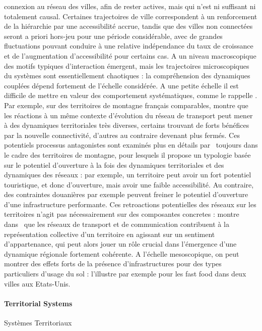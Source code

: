 {connexion au réseau des villes, afin de rester actives, mais qui n'est ni suffisant ni totalement causal. Certaines trajectoires de ville correspondent à un renforcement de la hiérarchie par une accessibilité accrue, tandis que des villes non connectées seront a priori hors-jeu pour une période considérable, avec de grandes fluctuations pouvant conduire à une relative indépendance du taux de croissance et de l'augmentation d'accessibilité pour certains cas. A un niveau macroscopique des motifs typiques d'interaction émergent, mais les trajectoires microscopiques du systèmes sont essentiellement chaotiques : la compréhension des dynamiques couplées dépend fortement de l'échelle considérée. A une petite échelle il est difficile de mettre en valeur des comportement systématiques, comme le rappelle . Par exemple, sur des territoires de montagne français comparables, \cite{berne2008ouverture} montre que les réactions à un même contexte d'évolution du réseau de transport peut mener à des dynamiques territoriales très diverses, certains trouvant de forts bénéfices par la nouvelle connectivité, d'autres au contraire devenant plus fermés. Ces potentiels processus antagonistes sont examinés plus en détails par~\cite{bernier2007dynamiques} toujours dans le cadre des territoires de montagne, pour lesquels il propose un typologie basée sur le potentiel d'ouverture à la fois des dynamiques territoriales et des dynamiques des réseaux : par exemple, un territoire peut avoir un fort potentiel touristique, et donc d'ouverture, mais avoir une faible accessibilité. Au contraire, des contraintes douanières par exemple peuvent freiner le potentiel d'ouverture d'une infrastructure performante. Ces retroactions potentielles des réseaux sur les territoires n'agit pas nécessairement sur des composantes concretes :  montre dans~\cite{claval1987reseaux} que les réseaux de transport et de communication contribuent à la représentation collective d'un territoire en agissant sur un sentiment d'appartenance, qui peut alors jouer un rôle crucial dans l'émergence d'une dynamique régionale fortement cohérente. A l'échelle mesoscopique, on peut montrer des effets forts de la présence d'infrastructures pour des types particuliers d'usage du sol : \cite{nilsson2016measuring} l'illustre par exemple pour les fast food dans deux villes aux Etats-Unis.
}



\paragraph{Territorial Systems}{Systèmes Territoriaux}



